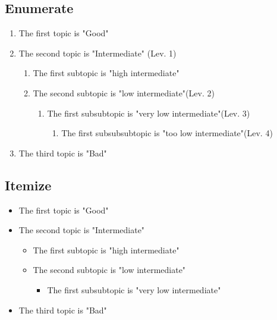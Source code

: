 \subsection{Enumerate}

\begin{enumerate}
	\item The first topic is "Good"
	\item The second topic is "Intermediate" (Lev. 1)
	\begin{enumerate}
		\item The first subtopic is "high intermediate"
		\item The second subtopic is "low intermediate"(Lev. 2)
		\begin{enumerate}
			\item The first subsubtopic is "very low intermediate"(Lev. 3)
			\begin{enumerate}
				\item The first subsubsubtopic is "too low intermediate"(Lev. 4)
			\end{enumerate}
		\end{enumerate}
	\end{enumerate}
	\item The third topic is "Bad"
\end{enumerate}
 

\subsection{Itemize}

\begin{itemize}
	\item The first topic is "Good"
    \item The second topic is "Intermediate"
    \begin{itemize}
	     \item The first subtopic is "high intermediate"
	     \item The second subtopic is "low intermediate"
	     \begin{itemize}
		      \item The first subsubtopic is "very low intermediate"
	     \end{itemize}
\end{itemize}
\item The third topic is "Bad"
\end{itemize}

